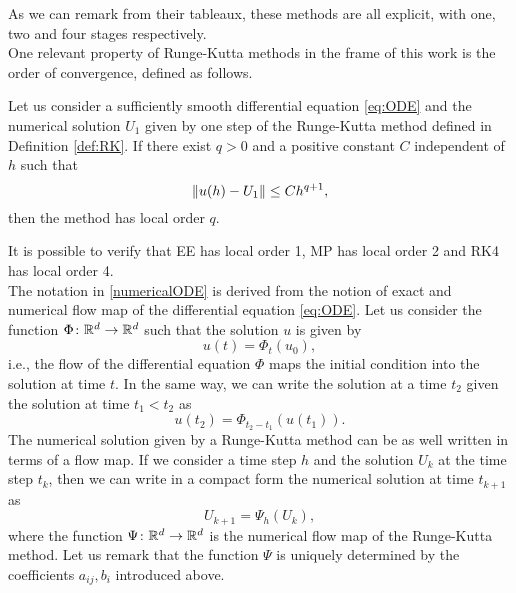 As we can remark from their tableaux, these methods are all explicit, with one, two and four stages respectively. \\
One relevant property of Runge-Kutta methods in the frame of this work is the order of convergence, defined as follows. 
\begin{definition} Let us consider a sufficiently smooth differential equation \eqref{eq:ODE} and the numerical solution $U_1$ given by one step of the Runge-Kutta method defined in Definition \ref{def:RK}. If there exist $q > 0$ and a positive constant $C$ independent of $h$ such that 
\begin{equation}
	\norm{u(h)-U_1} \leq Ch^{q+1},
\end{equation}
then the method has local order $q$. 
\end{definition} 
\noindent It is possible to verify \cite{HLW02} that EE has local order 1, MP has local order 2 and RK4 has local order 4. \\
The notation in \eqref{numericalODE} is derived from the notion of exact and numerical flow map of the differential equation \eqref{eq:ODE}. Let us consider the function $\Phi \colon \mathbb{R}^d \to \mathbb{R}^d$ such that the solution $u$ is given by
\begin{equation}
	u(t) = \Phi_t(u_0),
\end{equation}
i.e., the flow of the differential equation $\Phi$ maps the initial condition into the solution at time $t$. In the same way, we can write the solution at a time $t_2$ given the solution at time $t_1 < t_2$ as 
\begin{equation}
	u(t_2) = \Phi_{t_2 - t_1}(u(t_1)).
\end{equation}
The numerical solution given by a Runge-Kutta method can be as well written in terms of a flow map. If we consider a time step $h$ and the solution $U_k$ at the time step $t_k$, then we can write in a compact form the numerical solution at time $t_{k+1}$ as
\begin{equation}
	U_{k+1} = \Psi_h(U_k),
\end{equation}
where the function $\Psi\colon\mathbb{R}^d\to\mathbb{R}^d$ is the numerical flow map of the Runge-Kutta method. Let us remark that the function $\Psi$ is uniquely determined by the coefficients $a_{ij}, b_i$ introduced above. \\
